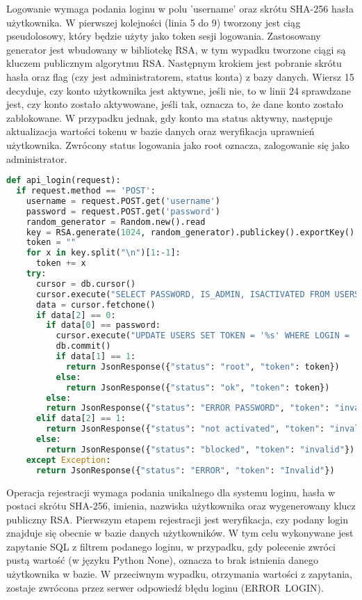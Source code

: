 	Logowanie wymaga podania loginu w polu 'username' oraz skrótu SHA-256 hasła użytkownika. W pierwszej kolejności (linia 5 do 9) tworzony jest ciąg pseudolosowy, który będzie użyty jako token sesji logowania. Zastosowany generator jest wbudowany w bibliotekę RSA, w tym wypadku tworzone ciągi są kluczem publicznym algorytmu RSA. Następnym krokiem jest pobranie skrótu hasła oraz flag (czy jest administratorem, status konta) z bazy danych. Wiersz 15 decyduje, czy konto użytkownika jest aktywne, jeśli nie, to w linii 24 sprawdzane jest, czy konto zostało aktywowane, jeśli tak, oznacza to, że dane konto zostało zablokowane. W przypadku jednak, gdy konto ma status aktywny, następuje aktualizacja wartości tokenu w bazie danych oraz weryfikacja uprawnień użytkownika. Zwrócony status logowania jako root oznacza, zalogowanie się jako administrator.
	
{\footnotesize 
\begin{lstlisting}[caption={API logowania}, label={lst:serwer login}, language=Python]	
def api_login(request):
  if request.method == 'POST':
    username = request.POST.get('username')
    password = request.POST.get('password')
    random_generator = Random.new().read
    key = RSA.generate(1024, random_generator).publickey().exportKey()
    token = ""
    for x in key.split("\n")[1:-1]:
      token += x
    try:
      cursor = db.cursor()
      cursor.execute("SELECT PASSWORD, IS_ADMIN, ISACTIVATED FROM USERS WHERE login='%s'" % username)
      data = cursor.fetchone()
      if data[2] == 0:
        if data[0] == password:
          cursor.execute("UPDATE USERS SET TOKEN = '%s' WHERE LOGIN = '%s'" % (token, username))
          db.commit()
          if data[1] == 1:
            return JsonResponse({"status": "root", "token": token})
          else:
            return JsonResponse({"status": "ok", "token": token})
        else:
        return JsonResponse({"status": "ERROR PASSWORD", "token": "invalid"})
      elif data[2] == 1:
        return JsonResponse({"status": "not activated", "token": "invalid"})
      else:
        return JsonResponse({"status": "blocked", "token": "invalid"})
    except Exception:
      return JsonResponse({"status": "ERROR", "token": "Invalid"})
\end{lstlisting}}
\newpage
Operacja rejestracji wymaga podania unikalnego dla systemu loginu, hasła w postaci skrótu SHA-256, imienia, nazwiska użytkownika oraz wygenerowany klucz publiczny RSA. Pierwszym etapem rejestracji jest weryfikacja, czy podany login znajduje się obecnie w bazie danych użytkowników. W tym celu wykonywane jest zapytanie SQL z filtrem podanego loginu, w przypadku, gdy polecenie zwróci pustą wartość (w języku Python None), oznacza to brak istnienia danego użytkownika w bazie. W przeciwnym wypadku, otrzymania wartości z zapytania, zostaje zwrócona przez serwer odpowiedź błędu loginu (ERROR~LOGIN).

